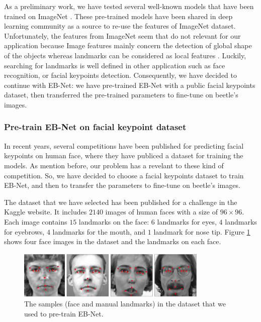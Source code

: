 \documentclass[review]{elsarticle}
\begin{document}
As a preliminary work, we have tested several well-known models \cite{krizhevsky2012imagenet, simonyan2014very} that have been trained on ImageNet \cite{deng2009imagenet}. These pre-trained models have been shared in deep learning community as a source to re-use the features of ImageNet dataset. Unfortunately, the features from ImageNet seem that do not relevant for our application because Image features mainly concern the detection of global shape of the objects whereas landmarks can be considered as local features \cite{lin2016homemade}. Luckily, searching for landmarks is well defined in other application such as face recognition, or facial keypoints detection. Consequently, we have decided to continue with EB-Net: we have pre-trained EB-Net with a public facial keypoints dataset, then transferred the pre-trained parameters to fine-tune on beetle's images.

\subsubsection{Pre-train EB-Net on facial keypoint dataset}
In recent years, several competitions have been published for predicting facial keypoints on human face, where they have publiced a dataset for training the models. As mention before, our problem has a revelant to these kind of competition. So, we have decided to choose a facial keypoints dataset to train EB-Net, and then to transfer the parameters to fine-tune on beetle's images.

The dataset that we have selected has been published for a challenge in the Kaggle website. It includes $2140$ images of human faces with a size of $96 \times 96$. Each image contains $15$ landmarks on the face: $6$ landmarks for eyes, $4$ landmarks for eyebrows, $4$ landmarks for the mouth, and $1$ landmark for nose tip. Figure \ref{fighmface} shows four face images in the dataset and the landmarks on each face.

\begin{figure}[h!]
	\centering
	\includegraphics[width=0.81\textwidth]{images/face_dataset_2}
	\caption{The samples (face and manual landmarks) in the dataset that we used to pre-train EB-Net.}
	\label{fighmface}
\end{figure}
\end{document}

